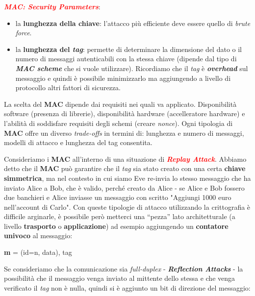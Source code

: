 \begin{flushleft}
    \smallskip

    \textcolor{red}{\textbf{\textit{MAC: Security Parameters}}}:
    \begin{itemize}[nosep]
        \item la \textbf{lunghezza della chiave}: l'attacco più efficiente deve essere quello di \textit{brute force}.
        \item la \textbf{lunghezza del \textit{tag}}: permette di determinare la dimensione del dato o il numero di messaggi autenticabili con la stessa chiave (dipende dal tipo di \textbf{\textit{MAC scheme}} che si vuole utilizzare). Ricordiamo che il \textit{tag} è \textbf{\textit{overhead}} sul messaggio e quindi è possibile minimizzarlo ma aggiungendo a livello di protocollo altri fattori di sicurezza. 
    \end{itemize}

    La scelta del \textbf{MAC} dipende dai requisiti nei quali va applicato. Disponibilità software (presenza di librerie), disponibilità hardware (accelleratore hardware) e l'abilità di soddisfare requisiti degli schemi (creare \textit{nonce}). Ogni tipologia di \textbf{MAC} offre un diverso \textit{trade-offs} in termini di: lunghezza e numero di messaggi, modelli di attacco e lunghezza del tag consentita.

    \medskip

    Consideriamo i \textbf{MAC} all'interno di una situazione di \textcolor{red}{\textbf{\textit{Replay Attack}}}. Abbiamo detto che il \textbf{MAC} può garantire che il \textit{tag} sia stato creato con una certa \textbf{chiave simmetrica}, ma nel contesto in cui siamo Eve re-invia lo stesso messaggio che ha inviato Alice a Bob, che è valido, perché creato da Alice - se Alice e Bob fossero due banchieri e Alice inviasse un messaggio con scritto "Aggiungi 1000 euro nell'account di Carlo". Con queste tipologie di attacco utilizzando la crittografia è difficile arginarle, è possibile però metterci una ``pezza'' lato architetturale (a livello \textbf{trasporto} o \textbf{applicazione}) ad esempio aggiungendo un \textbf{contatore univoco} al messaggio:
    
    {\centering
        \textbf{m} = (id=n, data), tag
    \par}

    Se consideriamo che la comunicazione sia \textit{full-duplex} - \textbf{\textit{Reflection Attacks}} - la possibilità che il messaggio venga inviato al mittente dello stessa e che venga verificato il \textit{tag} non è nulla, quindi si è aggiunto un bit di direzione del messaggio:


\end{flushleft}
